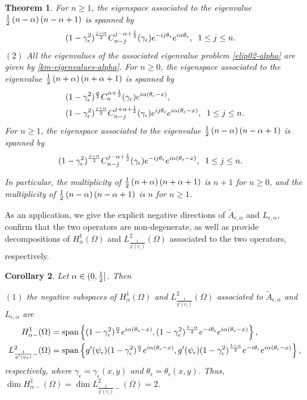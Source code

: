 \documentclass[1 [leqno, 11pt]{amsart}
\numberwithin{equation}{section}
\let\ep=\epsilon
\newtheorem{Theorem}{Theorem}[section]
\newtheorem{Corollary}[Theorem]{Corollary}
\begin{document}
\begin{CJK*}{GBK}{song}
\begin{Theorem}
For  $n\geq1$,
the eigenspace associated to the eigenvalue  ${1\over2}\left(n-\alpha\right)\left( n-\alpha+1\right)$ is spanned by
\begin{align}\label{nonkm-eigenfunctions22}
 &(1-\gamma_\ep^2)^{j-\alpha\over2}C_{n-j}^{{j-\alpha+{1\over2}}}(\gamma_\ep)e^{-ij\theta_\ep}e^{i\alpha\theta_\ep},\;\;1\leq j\leq n.
 \end{align}
\fi
$(2)$ All the eigenvalues  of the associated eigenvalue problem \eqref{elip02-alpha} are
given by \eqref{km-eigenvalues-alpha}.  For $n\geq0$,
the eigenspace associated to the eigenvalue  ${1\over2}\left(n+\alpha\right)\left( n+\alpha+1\right)$ is spanned by
\begin{align*}
&(1-\gamma_\ep^2)^{\alpha\over2}C_n^{\alpha+{1\over2}}(\gamma_\ep)e^{i\alpha(\theta_\ep-x)},\\\nonumber
 &(1-\gamma_\ep^2)^{j+\alpha\over2}C_{n-j}^{{j+\alpha+{1\over2}}}(\gamma_\ep)e^{ij\theta_\ep}e^{i\alpha(\theta_\ep-x)},\;\;1\leq j\leq n.
 \end{align*}
For  $n\geq1$,
the eigenspace associated to the eigenvalue  ${1\over2}\left(n-\alpha\right)\left( n-\alpha+1\right)$ is spanned by
\begin{align*}
 &(1-\gamma_\ep^2)^{j-\alpha\over2}C_{n-j}^{{j-\alpha+{1\over2}}}(\gamma_\ep)e^{-ij\theta_\ep}e^{i\alpha(\theta_\ep-x)},\;\;1\leq j\leq n.
 \end{align*}


 In particular,
the multiplicity of ${1\over2}\left(n+\alpha\right)\left( n+\alpha+1\right)$ is $n+1$ for  $n\geq0$, and the multiplicity of ${1\over2}\left(n-\alpha\right)\left( n-\alpha+1\right)$ is $n$ for  $n\geq1$.
\end{Theorem}

As an application, we give
 the explicit negative directions of  $\tilde A_{\ep,\alpha}$ and $L_{\ep,\alpha}$, confirm that the two operators are non-degenerate, as well as  provide   decompositions of
$H_\alpha^1(\Omega)$ and $L^2_{\frac{1}{g'(\psi_\ep)}}(\Omega)$  associated to  the two operators, respectively.

\begin{Corollary}\label{A-L-dec-e-alpha}
 Let $\alpha\in(0,{1\over2}]$. Then

$(1)$  the negative subspaces of  $H_\alpha^1(\Omega)$ and $L^2_{\frac{1}{g'(\psi_\ep)}}(\Omega)$  associated to $\tilde A_{\ep,\alpha}$ and $L_{\ep,\alpha}$ are
 \begin{align*} H_{\alpha-}^1(\Omega)&=\textup{span}\left\{(1-\gamma_\ep^2)^{\alpha\over2}e^{i\alpha(\theta_\ep-x)},
 (1-\gamma_\ep^2)^{1-\alpha\over2}e^{-i\theta_\ep}e^{i\alpha(\theta_\ep-x)}\right\},\\
 L^2_{\frac{1}{g'(\psi_\ep)}-}(\Omega)&=\textup{span}\left\{g'(\psi_\ep)(1-\gamma_\ep^2)^{\alpha\over2}e^{i\alpha(\theta_\ep-x)},
 g'(\psi_\ep)(1-\gamma_\ep^2)^{1-\alpha\over2}e^{-i\theta_\ep}e^{i\alpha(\theta_\ep-x)}\right\},
\end{align*}
respectively, where $\gamma_\ep=\gamma_\ep(x,y)$ and $\theta_\ep=\theta_\ep(x,y)$.
Thus,  $\dim H_{\alpha-}^1(\Omega)=\dim L^2_{\frac{1}{g'(\psi_\ep)}-}(\Omega)=2$.


\end{Corollary}
\end{CJK*}
\end{document}
